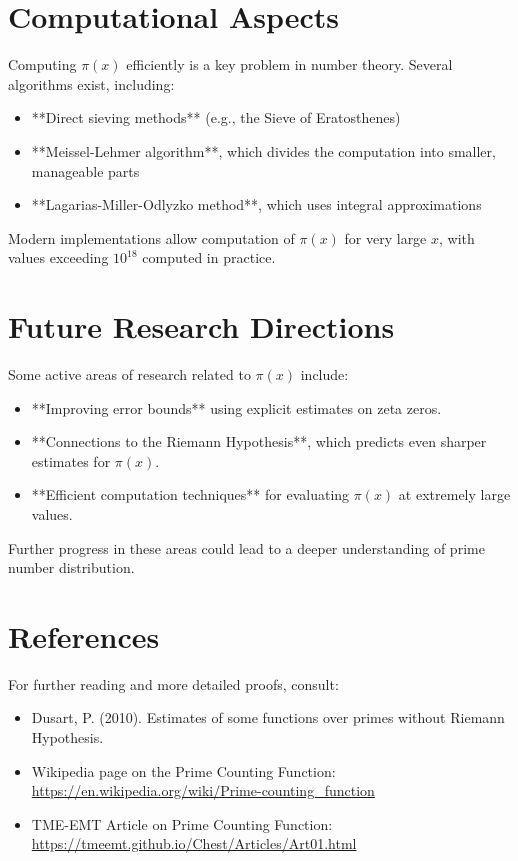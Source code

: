 \section{Computational Aspects}
Computing $\pi(x)$ efficiently is a key problem in number theory. Several algorithms exist, including:
\begin{itemize}
    \item **Direct sieving methods** (e.g., the Sieve of Eratosthenes)
    \item **Meissel-Lehmer algorithm**, which divides the computation into smaller, manageable parts
    \item **Lagarias-Miller-Odlyzko method**, which uses integral approximations
\end{itemize}
Modern implementations allow computation of $\pi(x)$ for very large $x$, with values exceeding $10^{18}$ computed in practice.

\section{Future Research Directions}
Some active areas of research related to $\pi(x)$ include:
\begin{itemize}
    \item **Improving error bounds** using explicit estimates on zeta zeros.
    \item **Connections to the Riemann Hypothesis**, which predicts even sharper estimates for $\pi(x)$.
    \item **Efficient computation techniques** for evaluating $\pi(x)$ at extremely large values.
\end{itemize}
Further progress in these areas could lead to a deeper understanding of prime number distribution.

\section{References}
For further reading and more detailed proofs, consult:
\begin{itemize}
    \item Dusart, P. (2010). Estimates of some functions over primes without Riemann Hypothesis.
    \item Wikipedia page on the Prime Counting Function: \url{https://en.wikipedia.org/wiki/Prime-counting_function}
    \item TME-EMT Article on Prime Counting Function: \url{https://tmeemt.github.io/Chest/Articles/Art01.html}
\end{itemize}
